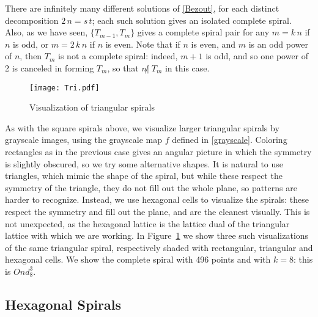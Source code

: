 \documentclass{article}
\theoremstyle{definition}
\def\ndiv{{\not|\;}}
\begin{document}
There are infinitely many different solutions of \eqref{Bezout}, for
each distinct decomposition $2\,n=s\,t$; each such solution gives an
isolated complete spiral.  Also, as we have seen, $\{T_{m-1},T_m\}$
gives a complete spiral pair for any $m=k\,n$ if $n$ is odd, or
$m=2\,k\,n$ if $n$ is even.  Note that if $n$ is even, and $m$ is an
odd power of $n$, then $T_m$ is not a complete spiral: indeed, $m+1$
is odd, and so one power of 2 is canceled in forming $T_m$, so that
$n \ndiv T_m$ in this case.

\begin{figure}[htb]
  \centering
  \texttt{[image: Tri.pdf]}
  \caption{Visualization of triangular spirals}
  \label{fig:trishades}
\end{figure}

As with the square spirals above, we visualize larger triangular
spirals by grayscale images, using the grayscale map $f$ defined in
\eqref{grayscale}.  Coloring rectangles as in the previous case gives an
angular picture in which the symmetry is slightly obscured, so we try
some alternative shapes.  It is natural to use triangles, which mimic
the shape of the spiral, but while these respect the symmetry of the
triangle, they do not fill out the whole plane, so patterns are harder
to recognize.  Instead, we use hexagonal cells to visualize the
spirals: these respect the symmetry and fill out the plane, and are
the cleanest visually.  This is not unexpected, as the hexagonal
lattice is the lattice dual of the triangular lattice with which we
are working.  In Figure~\ref{fig:trishades} we show three such
visualizations of the same triangular spiral, respectively shaded with
rectangular, triangular and hexagonal cells.  We show the complete
spiral with 496 points and with $k=8$: this is $Ond_8^3$.

\subsection{Hexagonal Spirals}
\end{document}
